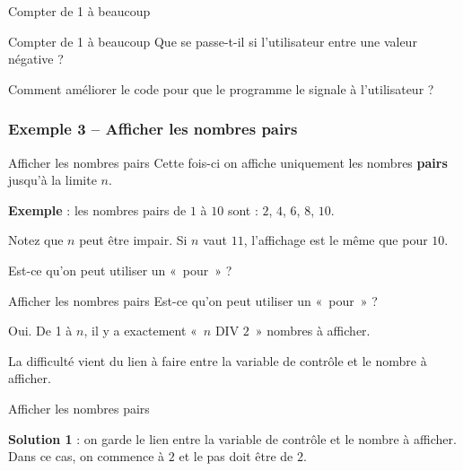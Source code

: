 \begin{frame}{Compter de 1 à beaucoup}
\end{frame}

\begin{frame}{Compter de 1 à beaucoup}
	Que se passe-t-il si l'utilisateur entre une valeur négative ?
	
	\bigskip
	
	Comment améliorer le code pour que le programme
	le signale à l'utilisateur ?
\end{frame}

\subsubsection{Exemple 3 -- Afficher les nombres pairs}

\begin{frame}{Afficher les nombres pairs}
	Cette fois-ci on affiche uniquement les nombres 
	\textbf{pairs} jusqu'à la limite $n$.
	
	\bigskip
	
	\textbf{Exemple} : 
	les nombres pairs de $1$ à $10$ sont : $2$, $4$, $6$, $8$, $10$.
	
	\bigskip
	
	Notez que $n$ peut être impair. Si $n$ vaut $11$, 
	l'affichage est le même que pour $10$.

	\bigskip

	Est-ce qu'on peut utiliser un «~pour~» ? 
\end{frame}

\begin{frame}{Afficher les nombres pairs}
	Est-ce qu'on peut utiliser un «~pour~» ? 

	\bigskip
	
	Oui. De 1 à $n$, il y a exactement «~$n$ DIV $2$~» nombres à afficher. 
	
	\bigskip
	
	La difficulté vient du lien à faire entre la variable de
	contrôle et le nombre à afficher.
\end{frame}

\begin{frame}{Afficher les nombres pairs}

	\textbf{Solution 1} : 
	on garde le lien entre la variable de contrôle 
	et le nombre à afficher. 
	Dans ce cas, on commence à $2$ et le pas doit être de $2$.

	\bigskip
	
\end{frame}

